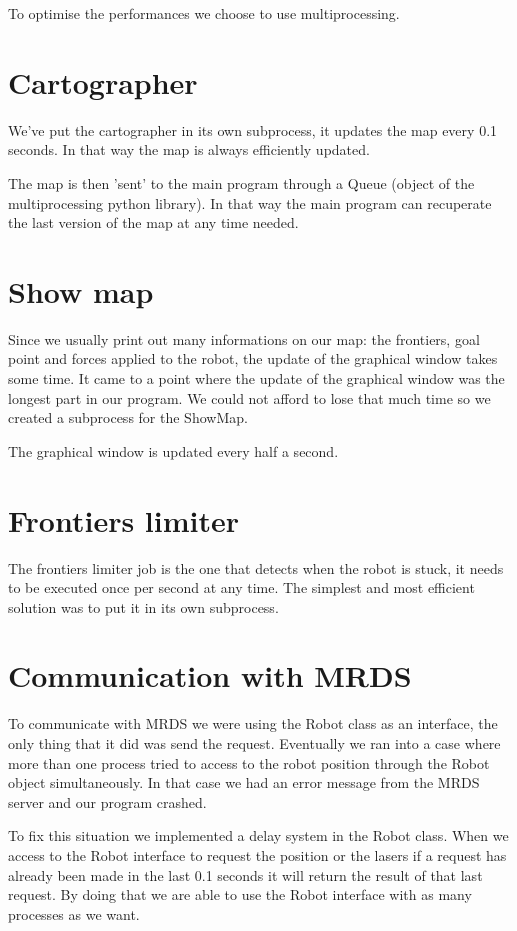 To optimise the performances we choose to use multiprocessing.

\section{Cartographer}

We've put the cartographer in its own subprocess, it updates the map every 0.1 seconds.
In that way the map is always efficiently updated.

The map is then 'sent' to the main program through a Queue (object of the multiprocessing python library).
In that way the main program can recuperate the last version of the map at any time needed.

\section{Show map}

Since we usually print out many informations on our map: the frontiers, goal point and forces applied to the robot, the update of the graphical window takes some time.
It came to a point where the update of the graphical window was the longest part in our program.
We could not afford to lose that much time so we created a subprocess for the ShowMap.

The graphical window is updated every half a second.

\section{Frontiers limiter}

The frontiers limiter job is the one that detects when the robot is stuck, it needs to be executed once per second at any time.
The simplest and most efficient solution was to put it in its own subprocess.

\section{Communication with MRDS}

To communicate with MRDS we were using the Robot class as an interface, the only thing that it did was send the request.
Eventually we ran into a case where more than one process tried to access to the robot position through the Robot object simultaneously.
In that case we had an error message from the MRDS server and our program crashed.

To fix this situation we implemented a delay system in the Robot class.
When we access to the Robot interface to request the position or the lasers if a request has already been made in the last 0.1 seconds it will return the result of that last request.
By doing that we are able to use the Robot interface with as many processes as we want.


